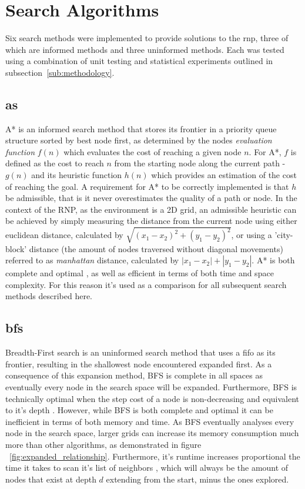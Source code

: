 \section{Search Algorithms} %
\label{sec:search_algorithms}
Six search methods were implemented to provide solutions to the \gls{rnp}, three of which are \gls{informed} methods and three \gls{uninformed} methods. Each was tested using a combination of unit testing and statistical experiments outlined in subsection~\ref{sub:methodology}.

\subsection{\texorpdfstring{\acrfull{as}}{A*}} %
\label{sub:as}
A* is an \gls{informed} search method that stores its frontier in a priority queue structure sorted by best node first, as determined by the nodes \textit{evaluation function} $f(n)$ which evaluates the cost of reaching a given node $n$. For A*, $f$ is defined as the cost to reach $n$ from the starting node along the current path - $g(n)$ and its heuristic function $h(n)$ which provides an estimation of the cost of reaching the goal. A requirement for A* to be correctly implemented is that $h$ be \gls{admissible}, that is it never overestimates the quality of a path or node. In the context of the RNP, as the environment is a 2D grid, an admissible heuristic can be achieved by simply measuring the distance from the current node using either euclidean distance, calculated by $\sqrt{(x_1 - x_2)^2 + (y_1 - y_2)^2}$, or using a 'city-block' distance (the amount of nodes traversed without diagonal movements) referred to as \textit{manhattan} distance, calculated by $\left|x_1 - x_2\right| + \left|y_1 - y_2\right|$. A* is both complete and optimal \parencite[104]{astar}, as well as efficient in terms of both time and space complexity. For this reason it's used as a comparison for all subsequent search methods described here.

\subsection{\texorpdfstring{\acrfull{bfs}}{BFS}} %
\label{sub:bfs}
Breadth-First search is an uninformed search method that uses a \acrfull{fifo} as its frontier, resulting in the shallowest node encountered expanded first. As a consequence of this expansion method, BFS is \gls{complete} in all spaces as eventually every node in the search space will be expanded. Furthermore, BFS is technically \gls{optimal} when the step cost of a node is non-decreasing and equivalent to it's depth \parencite[82]{aiama}. However, while BFS is both complete and optimal it can be inefficient in terms of both memory and time. As BFS eventually analyses every node in the search space, larger grids can increase its memory consumption much more than other algorithms, as demonstrated in figure ~\ref{fig:expanded_relationship}. Furthermore, it's runtime increases proportional the time it takes to scan it's list of neighbors \parencite[597]{introalgos}, which will always be the amount of nodes that exist at depth $d$ extending from the start, minus the ones explored.


